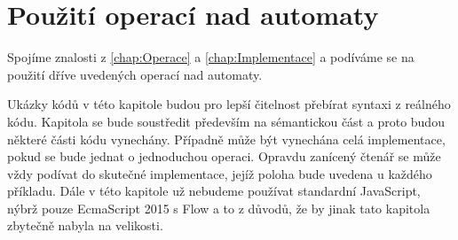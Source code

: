 \chapter{Použití operací nad automaty}
Spojíme znalosti z \ref{chap:Operace} a \ref{chap:Implementace} a podíváme se na použití dříve uvedených operací nad automaty.

Ukázky kódů v této kapitole budou pro lepší čitelnost přebírat syntaxi z reálného kódu. Kapitola se bude soustředit především na sémantickou část a proto budou některé části kódu vynechány. Případně může být vynechána celá implementace, pokud se bude jednat o jednoduchou operaci. Opravdu zanícený čtenář se může vždy podívat do skutečné implementace, jejíž poloha bude uvedena u každého příkladu. Dále v této kapitole už nebudeme používat standardní JavaScript, nýbrž pouze EcmaScript 2015 s Flow a to z důvodů, že by jinak tato kapitola zbytečně nabyla na velikosti. 















